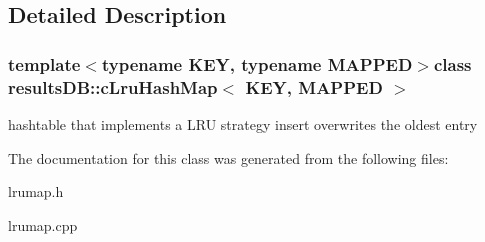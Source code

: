 \subsection{Detailed Description}
\subsubsection*{template$<$typename K\-E\-Y, typename M\-A\-P\-P\-E\-D$>$class results\-D\-B\-::c\-Lru\-Hash\-Map$<$ K\-E\-Y, M\-A\-P\-P\-E\-D $>$}

hashtable that implements a L\-R\-U strategy insert overwrites the oldest entry 

The documentation for this class was generated from the following files\-:\begin{DoxyCompactItemize}
\item 
lrumap.\-h\item 
lrumap.\-cpp\end{DoxyCompactItemize}
